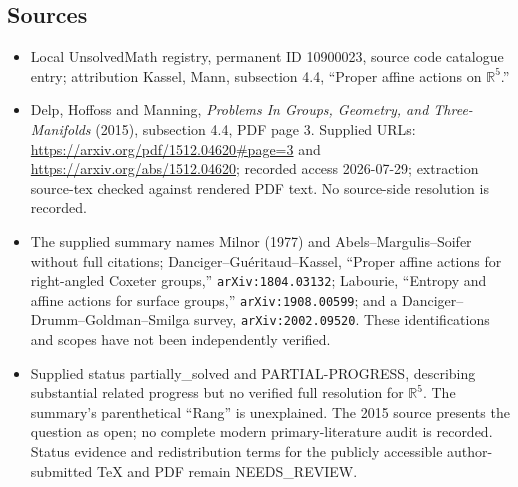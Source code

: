\documentclass[11pt]{article}
\newcommand{\R}{\mathbb{R}}
\begin{document}
\subsection{Sources}
\begin{itemize}
\item Local UnsolvedMath registry, permanent ID 10900023, source code catalogue entry; attribution Kassel, Mann, subsection 4.4, ``Proper affine actions on \(\R^5\).''
\item Delp, Hoffoss and Manning, \emph{Problems In Groups, Geometry, and Three-Manifolds} (2015), subsection 4.4, PDF page 3. Supplied URLs: \url{https://arxiv.org/pdf/1512.04620#page=3} and \url{https://arxiv.org/abs/1512.04620}; recorded access 2026-07-29; extraction source-tex checked against rendered PDF text. No source-side resolution is recorded.
\item The supplied summary names Milnor (1977) and Abels--Margulis--Soifer without full citations; Danciger--Gu\'{e}ritaud--Kassel, ``Proper affine actions for right-angled Coxeter groups,'' \texttt{arXiv:1804.03132}; Labourie, ``Entropy and affine actions for surface groups,'' \texttt{arXiv:1908.00599}; and a Danciger--Drumm--Goldman--Smilga survey, \texttt{arXiv:2002.09520}. These identifications and scopes have not been independently verified.
\item Supplied status partially\_solved and PARTIAL-PROGRESS, describing substantial related progress but no verified full resolution for \(\R^5\). The summary's parenthetical ``Rang'' is unexplained. The 2015 source presents the question as open; no complete modern primary-literature audit is recorded. Status evidence and redistribution terms for the publicly accessible author-submitted TeX and PDF remain NEEDS\_REVIEW.
\end{itemize}
\end{document}
